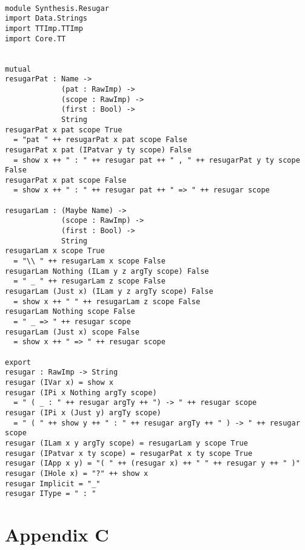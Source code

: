 \documentclass[a4paper]{article}
\begin{document}
\begin{center}
\begin{verbatim}

module Synthesis.Resugar 
import Data.Strings
import TTImp.TTImp
import Core.TT


mutual
resugarPat : Name ->
			 (pat : RawImp) ->
			 (scope : RawImp) ->
			 (first : Bool) ->
			 String
resugarPat x pat scope True 
  = "pat " ++ resugarPat x pat scope False
resugarPat x pat (IPatvar y ty scope) False 
  = show x ++ " : " ++ resugar pat ++ " , " ++ resugarPat y ty scope False
resugarPat x pat scope False
  = show x ++ " : " ++ resugar pat ++ " => " ++ resugar scope

resugarLam : (Maybe Name) ->
			 (scope : RawImp) -> 
			 (first : Bool) ->
			 String
resugarLam x scope True
  = "\\ " ++ resugarLam x scope False
resugarLam Nothing (ILam y z argTy scope) False
  = " _ " ++ resugarLam z scope False
resugarLam (Just x) (ILam y z argTy scope) False
  = show x ++ " " ++ resugarLam z scope False
resugarLam Nothing scope False
  = " _ => " ++ resugar scope 
resugarLam (Just x) scope False
  = show x ++ " => " ++ resugar scope

export
resugar : RawImp -> String
resugar (IVar x) = show x
resugar (IPi x Nothing argTy scope) 
  = " ( _ : " ++ resugar argTy ++ ") -> " ++ resugar scope
resugar (IPi x (Just y) argTy scope) 
  = " ( " ++ show y ++ " : " ++ resugar argTy ++ " ) -> " ++ resugar scope
resugar (ILam x y argTy scope) = resugarLam y scope True
resugar (IPatvar x ty scope) = resugarPat x ty scope True
resugar (IApp x y) = "( " ++ (resugar x) ++ " " ++ resugar y ++ " )"
resugar (IHole x) = "?" ++ show x
resugar Implicit = "_"
resugar IType = " : "

\end{verbatim}
\end{center}
\clearpage
\section{Appendix C}
\label{sec:org3add450}
\end{document}
